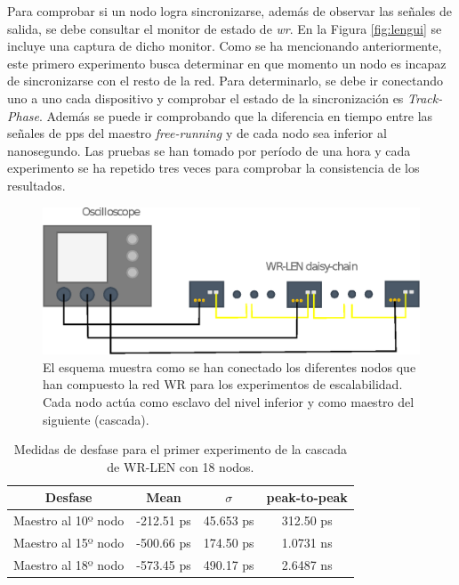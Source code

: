 Para comprobar si un nodo logra sincronizarse, además de observar las señales 
de salida, se debe consultar el monitor de estado de \textit{wr}. En la Figura 
\ref{fig:lengui} se incluye una captura de dicho monitor. Como se ha 
mencionando anteriormente, este primero experimento busca 
determinar en que momento un nodo es incapaz de sincronizarse con el resto de 
la red. Para determinarlo, se debe ir conectando uno a uno cada dispositivo y 
comprobar el estado de la sincronización es \textit{Track-Phase}. 
Además se puede ir comprobando que la diferencia en tiempo entre las señales de 
\gls{pps} del maestro \textit{free-running} y de cada nodo sea inferior al 
nanosegundo. Las pruebas se han tomado por período de una hora y cada 
experimento se ha repetido tres veces para comprobar la consistencia de los 
resultados.

\begin{figure}
	\centering
	\includegraphics[width=0.7\linewidth]{imagenes/chain_schema}
	\caption[Esquema de conexión para los experimentos de escalabilidad.]{El 
	esquema muestra como se han conectado los diferentes nodos que han 
	compuesto la red WR para los experimentos de escalabilidad. Cada nodo actúa 
	como esclavo del nivel inferior y como maestro del siguiente (cascada).}
	\label{fig:chainschema}
\end{figure}

\begin{table}
	\renewcommand{\arraystretch}{1.3}
	\caption{Medidas de desfase para el primer experimento de la cascada de 
	WR-LEN con 18 nodos.}
	\label{tab:cascada1}
	\centering
	\begin{tabular}{|c||c||c||c|}
		\hline
		Desfase & Mean & $\sigma$ & peak-to-peak \\
		\hline
		Maestro al 10º nodo & -212.51 ps & 45.653 ps & 312.50 ps \\
		\hline
		Maestro al 15º nodo & -500.66 ps & 174.50 ps & 1.0731 ns \\
		\hline
		Maestro al 18º nodo & -573.45 ps & 490.17 ps & 2.6487 ns \\
		\hline
	\end{tabular}
\end{table}

